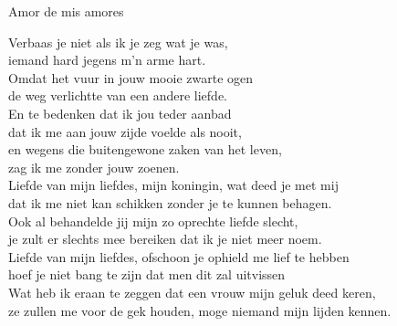 \begin{song}[vals]{Amor de mis amores}

\clearpage
\begin{translation}
Verbaas je niet als ik je zeg wat je was,\\
iemand hard jegens m'n arme hart.\\
Omdat het vuur in jouw mooie zwarte ogen\\
de weg verlichtte van een andere liefde.\\
\vspace{1ex}En te bedenken dat ik jou teder aanbad\\
dat ik me aan jouw zijde voelde als nooit,\\
en wegens die buitengewone zaken van het leven,\\
zag ik me zonder jouw zoenen.\\
\vspace{1ex}Liefde van mijn liefdes, mijn koningin, wat deed je met mij\\
dat ik me niet kan schikken zonder je te kunnen behagen.\\
Ook al behandelde jij mijn zo oprechte liefde slecht,\\
je zult er slechts mee bereiken dat ik je niet meer noem.\\
Liefde van mijn liefdes, ofschoon je ophield me lief te hebben\\
hoef je niet bang te zijn dat men dit zal uitvissen\\
Wat heb ik eraan te zeggen dat een vrouw mijn geluk deed keren,\\
ze zullen me voor de gek houden, moge niemand mijn lijden kennen.
\end{translation}

\end{song}
